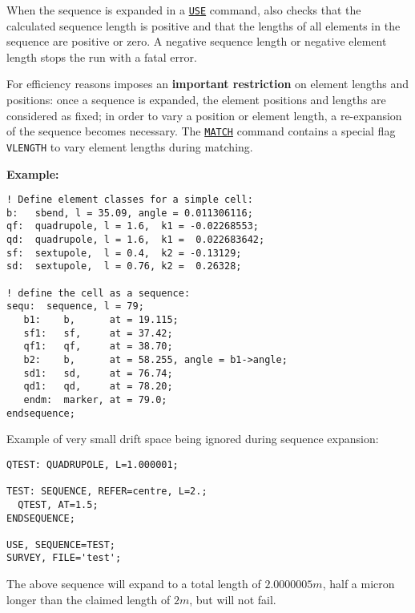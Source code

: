 \begin{5.02.06}
When the sequence is expanded in a \hyperref[sec:use]{\tt USE} 
command, \madx also checks that the calculated sequence length 
is positive and that the lengths of all elements in the sequence 
are positive or zero. A negative sequence length or negative element 
length stops the \madx run with a fatal error.
\end{5.02.06}

For efficiency reasons \madx imposes an {\bf important restriction}
on element lengths and positions: once a sequence is expanded, the
element positions and lengths are considered as fixed; in order to vary
a position or element length, a re-expansion of the sequence becomes
necessary. The \hyperref[chap:match]{\tt MATCH} command contains a special flag 
{\tt VLENGTH} to vary element lengths during matching.

{\bf Example:}
\begin{verbatim}
! Define element classes for a simple cell:
b:   sbend, l = 35.09, angle = 0.011306116;
qf:  quadrupole, l = 1.6,  k1 = -0.02268553;
qd:  quadrupole, l = 1.6,  k1 =  0.022683642;
sf:  sextupole,  l = 0.4,  k2 = -0.13129;
sd:  sextupole,  l = 0.76, k2 =  0.26328;

! define the cell as a sequence:
sequ:  sequence, l = 79;
   b1:    b,      at = 19.115;
   sf1:   sf,     at = 37.42;
   qf1:   qf,     at = 38.70;
   b2:    b,      at = 58.255, angle = b1->angle;
   sd1:   sd,     at = 76.74;
   qd1:   qd,     at = 78.20;
   endm:  marker, at = 79.0;
endsequence;
\end{verbatim}




Example of very small drift space being ignored during sequence
expansion: 
\begin{verbatim}
QTEST: QUADRUPOLE, L=1.000001;

TEST: SEQUENCE, REFER=centre, L=2.;
  QTEST, AT=1.5;
ENDSEQUENCE;

USE, SEQUENCE=TEST;
SURVEY, FILE='test';
\end{verbatim}
The above sequence will expand to a total length of $2.0000005 m$, half
a micron longer than the claimed length of $2 m$, but will not fail.
